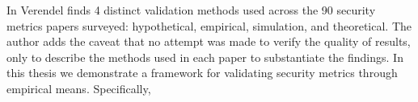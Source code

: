 
In \cite{Verendel_2009} Verendel finds 4 distinct validation methods used across the 90 security metrics papers surveyed: hypothetical, empirical, simulation, and theoretical. The author adds the caveat that no attempt was made to verify the quality of results, only to describe the methods used in each paper to substantiate the findings. In this thesis we demonstrate a framework for validating security metrics through empirical means. Specifically, 
\cite{Sonmez_2019}